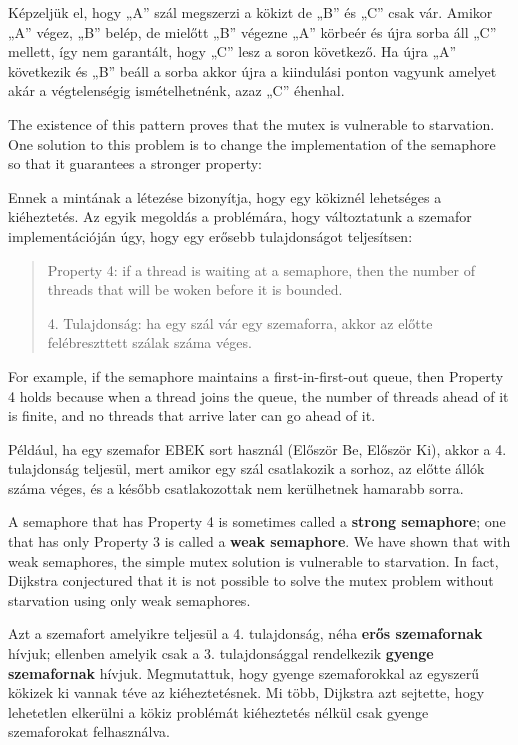 \documentclass{book}
\begin{document}
Képzeljük el, hogy „A” szál megszerzi a kökizt de „B” és „C” csak vár.
Amikor „A” végez, „B” belép, de mielőtt „B” végezne „A” körbeér és
újra sorba áll „C” mellett, így nem garantált, hogy „C” lesz a soron következő.
Ha újra „A” következik és „B” beáll a sorba akkor újra a kiindulási ponton
vagyunk amelyet akár a végtelenségig ismételhetnénk, azaz „C” éhenhal.

The existence of this pattern proves that the mutex is
vulnerable to starvation.  One solution to this problem is
to change the implementation of the semaphore so that it
guarantees a stronger property:


Ennek a mintának a létezése bizonyítja, hogy egy kökiznél
lehetséges a kiéheztetés.
Az egyik megoldás a problémára, hogy változtatunk a szemafor implementációján úgy,
hogy egy erősebb tulajdonságot teljesítsen:

\begin{quote}
Property 4: if a thread is waiting at a semaphore, then the
number of threads that will be woken before it is bounded.

4. Tulajdonság: ha egy szál vár egy szemaforra, akkor az előtte
felébreszttett szálak száma véges. 
\end{quote}

For example, if the semaphore maintains a first-in-first-out
queue, then Property 4 holds because when a thread joins the
queue, the number of threads ahead of it is finite, and
no threads that arrive later can go ahead of it.

Például, ha egy szemafor EBEK sort használ (Először Be, Először Ki),
akkor a 4. tulajdonság teljesül,
mert amikor egy szál csatlakozik a sorhoz, az előtte állók száma véges, és a
később csatlakozottak nem kerülhetnek hamarabb sorra.

A semaphore that has Property 4 is sometimes called a {\bf strong
semaphore}; one that has only Property 3 is called a {\bf weak
semaphore}.  We have shown that with weak semaphores, the simple mutex
solution is vulnerable to starvation.  In fact, Dijkstra conjectured
that it is not possible to solve the mutex problem without starvation
using only weak semaphores.

Azt a szemafort amelyikre teljesül a 4. tulajdonság, néha {\bf erős
szemafornak} hívjuk;
ellenben amelyik csak a 3. tulajdonsággal rendelkezik {\bf gyenge
szemafornak} hívjuk.
Megmutattuk, hogy gyenge szemaforokkal az egyszerű kökizek ki vannak téve
az kiéheztetésnek. Mi több, Dijkstra azt sejtette, hogy lehetetlen elkerülni
a kökiz problémát kiéheztetés nélkül csak gyenge szemaforokat felhasználva.
\end{document}
